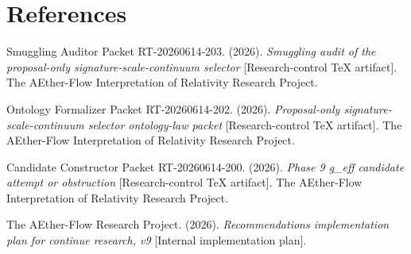 \documentclass[11pt]{article}
\begin{document}
\section*{References}

Smuggling Auditor Packet RT-20260614-203. (2026). \textit{Smuggling audit of
the proposal-only signature-scale-continuum selector} [Research-control TeX
artifact]. The AEther-Flow Interpretation of Relativity Research Project.

Ontology Formalizer Packet RT-20260614-202. (2026). \textit{Proposal-only
signature-scale-continuum selector ontology-law packet} [Research-control TeX
artifact]. The AEther-Flow Interpretation of Relativity Research Project.

Candidate Constructor Packet RT-20260614-200. (2026). \textit{Phase 9
g\_eff candidate attempt or obstruction} [Research-control TeX artifact]. The
AEther-Flow Interpretation of Relativity Research Project.

The AEther-Flow Research Project. (2026). \textit{Recommendations
implementation plan for continue research, v9} [Internal implementation plan].
\end{document}
